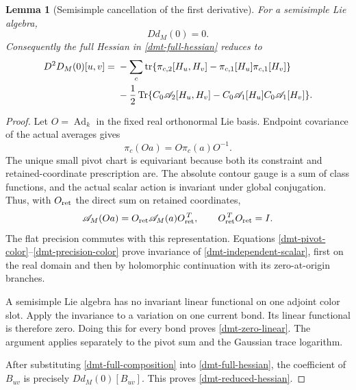 \documentclass[11pt]{article}
\newtheorem{lemma}[theorem]{Lemma}
\theoremstyle{remark}
\begin{document}
\begin{lemma}[Semisimple cancellation of the first derivative]
\label{dmt-linear-cancellation}
For a semisimple Lie algebra,
\begin{equation}
                         Dd_M(0)=0.
 \label{dmt-zero-linear}
\end{equation}
Consequently the full Hessian in
\eqref{dmt-full-hessian} reduces to
\begin{align}
 D^2D_M(0)[u,v]
 ={}&-\sum_c\operatorname{tr}
 \{\pi_{c,2}[H_u,H_v]
       -\pi_{c,1}[H_u]\pi_{c,1}[H_v]\}\notag\\
 &-\frac12\operatorname{Tr}
 \{C_0\mathscr A_2[H_u,H_v]
       -C_0\mathscr A_1[H_u]C_0\mathscr A_1[H_v]\}.
 \label{dmt-reduced-hessian}
\end{align}
\end{lemma}
\begin{proof}
Let \(O=\operatorname{Ad}_k\) in the fixed real orthonormal
Lie basis. Endpoint covariance of the actual averages gives
\begin{equation}
                  \pi_c(Oa)=O\pi_c(a)O^{-1}.
 \label{dmt-pivot-color}
\end{equation}
The unique small pivot chart is equivariant because both
its constraint and retained-coordinate prescription are.
The absolute contour gauge is a sum of class functions,
and the actual scalar action is invariant under global
conjugation. Thus, with \(O_{\rm ret}\) the direct sum
on retained coordinates,
\begin{equation}
 \mathscr A_M(Oa)
       =O_{\rm ret}\mathscr A_M(a)O_{\rm ret}^{\,T},
 \qquad O_{\rm ret}^{\,T}O_{\rm ret}=I.
 \label{dmt-precision-color}
\end{equation}
The flat precision commutes with this representation.
Equations \eqref{dmt-pivot-color}--\eqref{dmt-precision-color}
prove invariance of \eqref{dmt-independent-scalar}, first
on the real domain and then by holomorphic continuation
with its zero-at-origin branches.

A semisimple Lie algebra has no invariant linear functional
on one adjoint color slot. Apply the invariance to a variation
on one current bond. Its linear functional is therefore zero.
Doing this for every bond proves \eqref{dmt-zero-linear}.
The argument applies separately to the pivot sum and the
Gaussian trace logarithm.

After substituting \eqref{dmt-full-composition} into
\eqref{dmt-full-hessian}, the coefficient of \(B_{uv}\)
is precisely \(Dd_M(0)[B_{uv}]\). This proves
\eqref{dmt-reduced-hessian}.
\end{proof}
\end{document}
